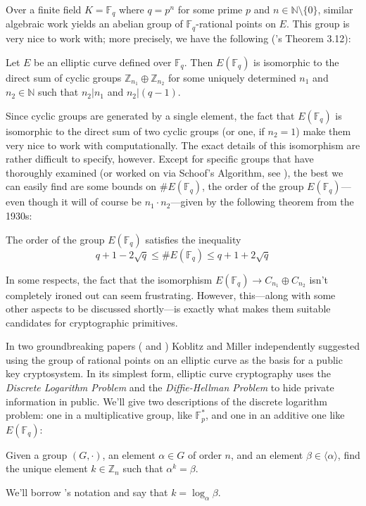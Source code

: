 Over a finite field $K = \mathbb{F}_q$ where $q = p^n$ for some prime $p$ and
    $n \in \mathbb{N}\setminus\{0\}$, similar algebraic work yields an abelian
    group of $\mathbb{F}_q$-rational points on $E$.
This group is very nice to work with; more precisely, we have the following
    (\cite{hankerson2004guide}'s Theorem 3.12):
\begin{thm}
Let $E$ be an elliptic curve defined over $\mathbb{F}_q$.
    Then $E(\mathbb{F}_q)$ is isomorphic to the direct sum of cyclic groups
    $\mathbb{Z}_{n_1} \oplus \mathbb{Z}_{n_2}$ for some uniquely determined
    $n_1$ and $n_2 \in \mathbb{N}$ such that $n_2\vert n_1$ and $n_2 \vert
    (q-1)$.
\end{thm}
Since cyclic groups are generated by a single element, the fact that
    $E(\mathbb{F}_q)$ is isomorphic to the direct sum of two cyclic groups (or
    one, if $n_2 = 1$) make them very nice to work with computationally.
The exact details of this isomorphism are rather difficult to specify, however.
Except for specific groups that have thoroughly examined (or worked on via
    Schoof's Algorithm, see \cite{stinson2005cryptography}), the best we can
    easily find are some bounds on $\#E(\mathbb{F}_q)$, the order of the group
    $E(\mathbb{F}_q)$---even though it will of course be $n_1 \cdot
    n_2$---given by the following theorem from the 1930s:
\begin{thm}
  The order of the group $E(\mathbb{F}_q)$ satisfies the inequality
  \begin{displaymath}
    q + 1 - 2\sqrt{q} \le \#E(\mathbb{F}_q) \le q + 1 + 2\sqrt{q}
  \end{displaymath}
\end{thm}

In some respects, the fact that the isomorphism $E(\mathbb{F}_q) \to
    C_{n_1} \oplus C_{n_2}$ isn't completely ironed out can seem frustrating.
However, this---along with some other aspects to be discussed shortly---is
    exactly what makes them suitable candidates for cryptographic primitives.



In two groundbreaking papers (\cite{koblitz1987elliptic} and
    \cite{miller1986use}) Koblitz and Miller independently suggested using
    the group of rational points on an elliptic curve as the basis for a public
    key cryptosystem.
In its simplest form, elliptic curve cryptography uses the \textit{Discrete
    Logarithm Problem} and the \textit{Diffie-Hellman Problem} to hide private
    information in public.
We'll give two descriptions of the discrete logarithm problem: one in a
    multiplicative group, like $\mathbb{F}_p^\ast$, and one in an additive one
    like $E(\mathbb{F}_q)$:
\begin{prob}
Given a group $(G, \cdot)$, an element $\alpha \in G$ of order $n$, and an
  element $\beta \in \langle \alpha \rangle$, find the unique element $k \in
  \mathbb{Z}_n$ such that $\alpha^k = \beta$.
\end{prob}
\noindent We'll borrow \cite{stinson2005cryptography}'s notation and say that
    $k = \log_\alpha \beta$.

